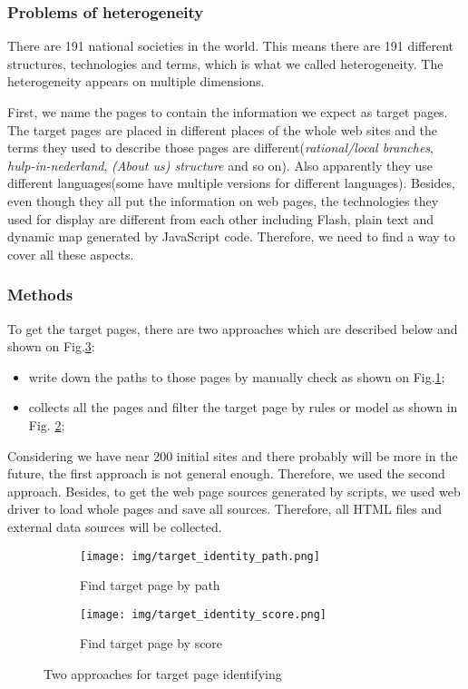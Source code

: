\documentclass[sigchi]{acmart}
\begin{document}
\subsubsection{Problems of heterogeneity}
There are 191 national societies in the world. This means there are 191 different structures, technologies and terms, which is what we called heterogeneity. The heterogeneity appears on multiple dimensions.

First, we name the pages to contain the information we expect as target pages. The target pages are placed in different places of the whole web sites and the terms they used to describe those pages are different(\textit{rational/local branches}, \textit{hulp-in-nederland}, \textit{(About us) structure} and so on). Also apparently they use different languages(some have multiple versions for different languages). Besides, even though they all put the information on web pages, the technologies they used for display are different from each other including Flash, plain text and dynamic map generated by JavaScript code. Therefore, we need to find a way to cover all these aspects.

\subsubsection{Methods}
To get the target pages, there are two approaches which are described below and shown on Fig.\ref{fig:target_page}:
\begin{itemize}
    \item write down the paths to those pages by manually check as shown on Fig.\ref{fig:target_path};
    \item collects all the pages and filter the target page by rules or model as shown in Fig. \ref{fig:target_score};
\end{itemize}
Considering we have near 200 initial sites and there probably will be more in the future, the first approach is not general enough. Therefore, we used the second approach. Besides, to get the web page sources generated by scripts, we used web driver to load whole pages and save all sources. Therefore, all HTML files and external data sources will be collected.
\begin{figure}
    \begin{subfigure}[b]{0.45\textwidth}
        \texttt{[image: img/target\_identity\_path.png]}
        \caption{Find target page by path}
        \label{fig:target_path}
    \end{subfigure}
    \begin{subfigure}[b]{0.45\textwidth}
        \texttt{[image: img/target\_identity\_score.png]}
        \caption{Find target page by score}
        \label{fig:target_score}
    \end{subfigure}
    \caption{Two approaches for target page identifying}\label{fig:target_page}
\end{figure}
\end{document}
